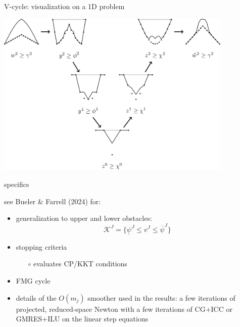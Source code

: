 \documentclass[svgnames,
               hyperref={colorlinks,citecolor=DeepPink4,linkcolor=FireBrick,urlcolor=Maroon},
               usepdftitle=false]  %
               {beamer}
\begin{document}
\begin{frame}{V-cycle: visualization on a 1D problem}

\centering
\includegraphics[width=0.85\textwidth]{../talk-dms/figs/vcycle-visualized.png}
\end{frame}


\begin{frame}{specifics}

see Bueler \& Farrell (2024) for:
\begin{itemize}
\item generalization to upper and lower obstacles:
    $$\mathcal{K}^J = \{\underline{\psi}^J \le v^J \le \overline{\psi}^J\}$$
\item stopping criteria
    \begin{itemize}
    \item[$\circ$] evaluates CP/KKT conditions
    \end{itemize}
\item FMG cycle
\item details of the $O(m_j)$ smoother used in the results: a few iterations of projected, reduced-space Newton with a few iterations of CG+ICC or GMRES+ILU on the linear step equations
\end{itemize}
\end{frame}
\end{document}
